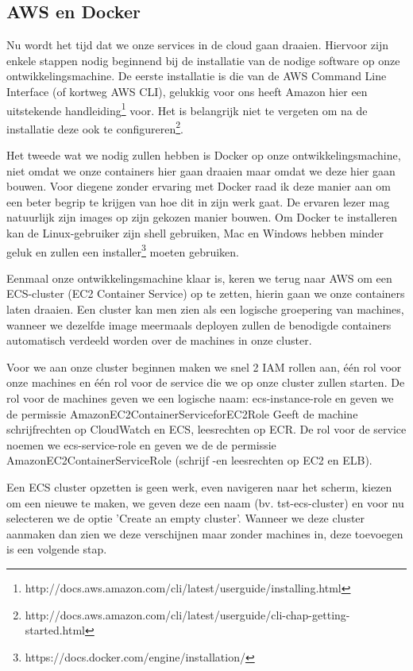 \documentclass{article}
\begin{document}
	\subsection{AWS en Docker}
	Nu wordt het tijd dat we onze services in de cloud gaan draaien. Hiervoor zijn enkele stappen nodig beginnend bij de installatie van de nodige software op onze ontwikkelingsmachine. De eerste installatie is die van de AWS Command Line Interface (of kortweg AWS CLI), gelukkig voor ons heeft Amazon hier een uitstekende handleiding\footnote{http://docs.aws.amazon.com/cli/latest/userguide/installing.html}
	voor. Het is belangrijk niet te vergeten om na de installatie deze ook te configureren\footnote{http://docs.aws.amazon.com/cli/latest/userguide/cli-chap-getting-started.html}.
	\par
	Het tweede wat we nodig zullen hebben is Docker op onze ontwikkelingsmachine, niet omdat we onze containers hier gaan draaien maar omdat we deze hier gaan bouwen. Voor diegene zonder ervaring met Docker raad ik deze manier aan om een beter begrip te krijgen van hoe dit in zijn werk gaat. De ervaren lezer mag natuurlijk zijn images op zijn gekozen manier bouwen. Om Docker te installeren kan de Linux-gebruiker zijn shell gebruiken, Mac en Windows hebben minder geluk en zullen een installer\footnote{https://docs.docker.com/engine/installation/} moeten gebruiken.
	\par
	Eenmaal onze ontwikkelingsmachine klaar is, keren we terug naar AWS om een ECS-cluster (EC2 Container Service) op te zetten, hierin gaan we onze containers laten draaien. Een cluster kan men zien als een logische groepering van machines, wanneer we dezelfde image meermaals deployen zullen de benodigde containers automatisch verdeeld worden over de machines in onze cluster.
	\par
	Voor we aan onze cluster beginnen maken we snel 2 IAM rollen aan, \'e\'en rol voor onze machines en \'e\'en rol voor de service die we op onze cluster zullen starten. De rol voor de machines geven we een logische naam: ecs-instance-role en geven we de permissie AmazonEC2ContainerServiceforEC2Role {Geeft de machine schrijfrechten op CloudWatch en ECS, leesrechten op ECR}. De rol voor de service noemen we ecs-service-role en geven we de de permissie AmazonEC2ContainerServiceRole (schrijf -en leesrechten op EC2 en ELB). 
	\par	
	 Een ECS cluster opzetten is geen werk, even navigeren naar het scherm, kiezen om een nieuwe te maken, we geven deze een naam (bv. tst-ecs-cluster) en voor nu selecteren we de optie 'Create an empty cluster'. Wanneer we deze cluster aanmaken dan zien we deze verschijnen maar zonder machines in, deze toevoegen is een volgende stap.
\end{document}
